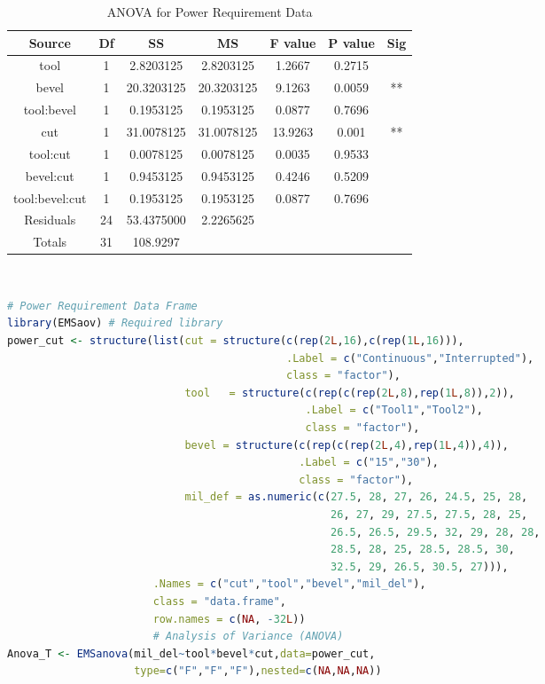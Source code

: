 \documentclass{WileySev}
\begin{document}
\begin{table}
\caption{ANOVA for Power Requirement Data}
\centering
\begin{tabular}{|c|c|c|c|c|cc|}
\hline
Source    &      Df&   SS     &     MS   & F value & P value & Sig \\
\hline
tool      &      1 & 2.8203125& 2.8203125&  1.2667 &0.2715   &     \\            
bevel     &      1 &20.3203125&20.3203125&  9.1263 &0.0059   &**   \\     
tool:bevel&      1 & 0.1953125& 0.1953125&  0.0877 &0.7696   &     \\ 
cut       &      1 &31.0078125&31.0078125& 13.9263 &0.001    &**   \\ 
tool:cut  &      1 & 0.0078125& 0.0078125&  0.0035 &0.9533   &     \\  
bevel:cut &      1 & 0.9453125& 0.9453125&  0.4246 &0.5209   &     \\ 
tool:bevel:cut & 1 & 0.1953125& 0.1953125&  0.0877 &0.7696   &     \\
Residuals      & 24&53.4375000& 2.2265625&         &         &     \\     
\hline
Totals         & 31&108.9297  &          &         &         &     \\
\hline
\end{tabular}
\label{tab:anova_cut_tool}
\end{table} 
\
\begin{lstlisting}[language=R]
# Power Requirement Data Frame
library(EMSaov) # Required library
power_cut <- structure(list(cut = structure(c(rep(2L,16),c(rep(1L,16))),
                                            .Label = c("Continuous","Interrupted"),
                                            class = "factor"),
                            tool   = structure(c(rep(c(rep(2L,8),rep(1L,8)),2)),
                                               .Label = c("Tool1","Tool2"),
                                               class = "factor"),
                            bevel = structure(c(rep(c(rep(2L,4),rep(1L,4)),4)),
                                              .Label = c("15","30"),
                                              class = "factor"),
                            mil_def = as.numeric(c(27.5, 28, 27, 26, 24.5, 25, 28,
                                                   26, 27, 29, 27.5, 27.5, 28, 25,
                                                   26.5, 26.5, 29.5, 32, 29, 28, 28,
                                                   28.5, 28, 25, 28.5, 28.5, 30,
                                                   32.5, 29, 26.5, 30.5, 27))),
                       .Names = c("cut","tool","bevel","mil_del"),
                       class = "data.frame",
                       row.names = c(NA, -32L))
                       # Analysis of Variance (ANOVA)
Anova_T <- EMSanova(mil_del~tool*bevel*cut,data=power_cut,
                    type=c("F","F","F"),nested=c(NA,NA,NA))
\end{lstlisting}
\end{document}
